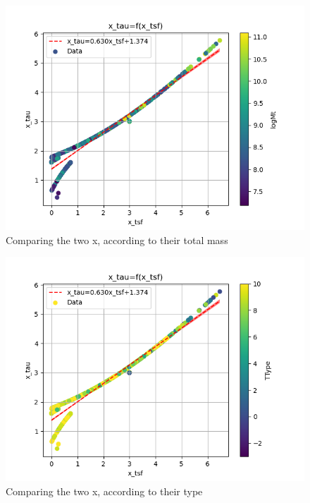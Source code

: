 \documentclass[a4paper,twocolumn]{article}
\begin{document}
\begin{figure}[!htpb]
\centering
\includegraphics[width=.9\linewidth]{./figs/x_tsf-x_tau-color_logMt.png}
\caption{\label{fig:Comparing the two x, according to their total mass}Comparing the two x, according to their total mass}
\end{figure}

\begin{figure}[!htpb]
\centering
\includegraphics[width=.9\linewidth]{./figs/x_tsf-x_tau-color_TType.png}
\caption{\label{fig:Comparing the two x, according to their type}Comparing the two x, according to their type}
\end{figure}
\end{document}
